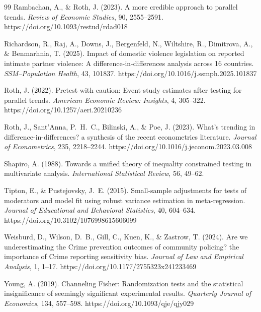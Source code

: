 \documentclass[12pt]{article}
\theoremstyle{definition}
\numberwithin{equation}{section}
\begin{document}
\begin{thebibliography}{99}
 Rambachan, A., \& Roth, J. (2023). A more credible approach to parallel trends. \emph{Review of Economic Studies}, 90, 2555--2591. https://doi.org/10.1093/restud/rdad018

 Richardson, R., Raj, A., Downs, J., Bergenfeld, N., Wiltshire, R., Dimitrova, A., \& Benmarhnia, T. (2025). Impact of domestic violence legislation on reported intimate partner violence: A difference-in-differences analysis across 16 countries. \emph{SSM--Population Health}, 43, 101837. https://doi.org/10.1016/j.ssmph.2025.101837

 Roth, J. (2022). Pretest with caution: Event-study estimates after testing for parallel trends. \emph{American Economic Review: Insights}, 4, 305--322. https://doi.org/10.1257/aeri.20210236

 Roth, J., Sant'Anna, P.~H.~C., Bilinski, A., \& Poe, J. (2023). What's trending in difference-in-differences? a synthesis of the recent econometrics literature. \emph{Journal of Econometrics}, 235, 2218--2244. https://doi.org/10.1016/j.jeconom.2023.03.008

 Shapiro, A. (1988). Towards a unified theory of inequality constrained testing in multivariate analysis. \emph{International Statistical Review}, 56, 49--62.

 Tipton, E., \& Pustejovsky, J.~E. (2015). Small-sample adjustments for tests of moderators and model fit using robust variance estimation in meta-regression. \emph{Journal of Educational and Behavioral Statistics}, 40, 604--634. https://doi.org/10.3102/1076998615606099

 Weisburd, D., Wilson, D.~B., Gill, C., Kuen, K., \& Zastrow, T. (2024). Are we underestimating the Crime prevention outcomes of community policing? the importance of Crime reporting sensitivity bias. \emph{Journal of Law and Empirical Analysis}, 1, 1--17. https://doi.org/10.1177/2755323x241233469

 Young, A. (2019). Channeling Fisher: Randomization tests and the statistical insignificance of seemingly significant experimental results. \emph{Quarterly Journal of Economics}, 134, 557--598. https://doi.org/10.1093/qje/qjy029

\end{thebibliography}
\end{document}
